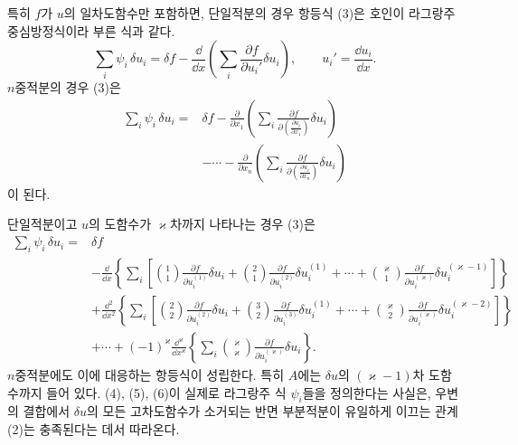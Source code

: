 특히 \(f\)가 \(u\)의 일차도함수만 포함하면, 단일적분의 경우 항등식 (3)은 호인이 \glqq{}라그랑주 중심방정식\grqq{}이라 부른 식과 같다.
\begin{equation}
\tag{4}
\sum_i\psi_i\,\delta u_i
=\delta f-\frac{\dd}{\dd x}
\left(\sum_i\frac{\partial f}{\partial u_i'}\delta u_i\right),
\qquad u_i'=\frac{\dd u_i}{\dd x}.
\end{equation}
\(n\)중적분의 경우 (3)은
\begin{equation}
\tag{5}
\begin{aligned}
\sum_i\psi_i\,\delta u_i
={}&\delta f
-\frac{\partial}{\partial x_1}
\left(\sum_i\frac{\partial f}
{\partial\left(\frac{\partial u_i}{\partial x_1}\right)}
\delta u_i\right)\\
&-\cdots-
\frac{\partial}{\partial x_n}
\left(\sum_i\frac{\partial f}
{\partial\left(\frac{\partial u_i}{\partial x_n}\right)}
\delta u_i\right)
\end{aligned}
\end{equation}
이 된다.

단일적분이고 \(u\)의 도함수가 \(\varkappa\)차까지 나타나는 경우 (3)은
\begin{equation}
\tag{6}
\begin{aligned}
\sum_i\psi_i\,\delta u_i
={}&\delta f\\
&-\frac{\dd}{\dd x}\left\{\sum_i\left[
\binom11\frac{\partial f}{\partial u_i^{(1)}}\delta u_i+
\binom21\frac{\partial f}{\partial u_i^{(2)}}\delta u_i^{(1)}
+\cdots+
\binom{\varkappa}{1}\frac{\partial f}{\partial u_i^{(\varkappa)}}
\delta u_i^{(\varkappa-1)}\right]\right\}\\
&+\frac{\dd^2}{\dd x^2}\left\{\sum_i\left[
\binom22\frac{\partial f}{\partial u_i^{(2)}}\delta u_i+
\binom32\frac{\partial f}{\partial u_i^{(3)}}\delta u_i^{(1)}
+\cdots+
\binom{\varkappa}{2}\frac{\partial f}{\partial u_i^{(\varkappa)}}
\delta u_i^{(\varkappa-2)}\right]\right\}\\
&+\cdots+
(-1)^\varkappa\frac{\dd^\varkappa}{\dd x^\varkappa}
\left\{\sum_i\binom{\varkappa}{\varkappa}
\frac{\partial f}{\partial u_i^{(\varkappa)}}\delta u_i\right\}.
\end{aligned}
\end{equation}
\(n\)중적분에도 이에 대응하는 항등식이 성립한다. 특히 \(A\)에는 \(\delta u\)의 \((\varkappa-1)\)차 도함수까지 들어 있다. (4), (5), (6)이 실제로 라그랑주 식 \(\psi_i\)들을 정의한다는 사실은, 우변의 결합에서 \(\delta u\)의 모든 고차도함수가 소거되는 반면 부분적분이 유일하게 이끄는 관계 (2)는 충족된다는 데서 따라온다.

